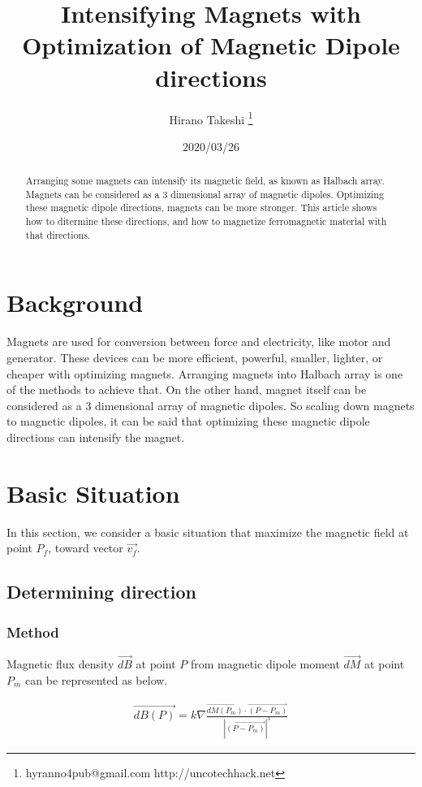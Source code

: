 \documentclass[dvipdfmx]{article}
\title{Intensifying Magnets with Optimization of Magnetic Dipole directions}
\author{Hirano Takeshi \thanks{hyranno4pub@gmail.com http://uncotechhack.net}}
\date{2020/03/26}
\begin{document}
\maketitle

\begin{abstract}
Arranging some magnets can intensify its magnetic field, as known as Halbach array.
Magnets can be considered as a 3 dimensional array of magnetic dipoles.
Optimizing these magnetic dipole directions, magnets can be more stronger.
This article shows how to ditermine these directions, and how to magnetize ferromagnetic material with that directions.
\end{abstract}

\section{Background}
Magnets are used for conversion between force and electricity, like motor and generator.
These devices can be more efficient, powerful, smaller, lighter, or cheaper with optimizing magnets.
Arranging magnets into Halbach array is one of the methods to achieve that.
On the other hand, magnet itself can be considered as a 3 dimensional array of magnetic dipoles.
So scaling down magnets to magnetic dipoles, it can be said that optimizing these magnetic dipole directions can intensify the magnet.



\section{Basic Situation}
In this section, we consider a basic situation that maximize the magnetic field at point $P_{f}$, toward vector $\overrightarrow{v_{f}}$.

\subsection{Determining direction}
\subsubsection{Method}
Magnetic flux density $\overrightarrow{dB}$ at point $P$ from magnetic dipole moment $\overrightarrow{dM}$ at point $P_{m}$ can be represented as below.

\begin{eqnarray}
	\overrightarrow{dB(P)} = k \nabla \frac{ \overrightarrow{dM(P_{m})} \cdot \overrightarrow{(P-P_{m})} }{ \left|\overrightarrow{(P-P_{m})}\right|^3 }
	\label{eq:dB}
\end{eqnarray}
\end{document}
